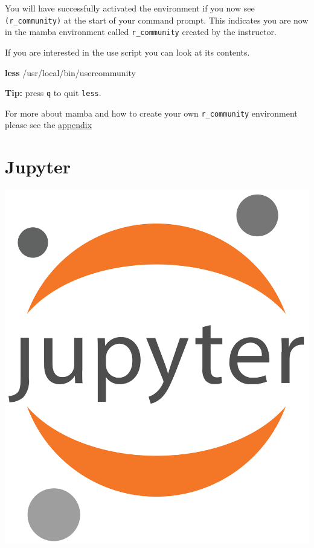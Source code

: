 \documentclass[
]{book}
\newenvironment{Shaded}{\begin{snugshade}}{\end{snugshade}}
\newcommand{\FunctionTok}[1]{\textcolor[rgb]{0.13,0.29,0.53}{\textbf{#1}}}
\newcommand{\NormalTok}[1]{#1}
\begin{document}
You will have successfully activated the environment if you now see \texttt{(r\_community)} at the start of your command prompt.
This indicates you are now in the mamba environment called \texttt{r\_community} created by the instructor.

If you are interested in the use script you can look at its contents.

\begin{Shaded}
\begin{Highlighting}[]
\FunctionTok{less}\NormalTok{ /usr/local/bin/usercommunity}
\end{Highlighting}
\end{Shaded}

\textbf{Tip:} press \texttt{q} to quit \texttt{less}.

For more about mamba and how to create your own \texttt{r\_community} environment please see the \protect\hyperlink{mamba_install}{appendix}

\hypertarget{jupyterchap}{%
\chapter{Jupyter}\label{jupyterchap}}

\includegraphics{figures/jupyter_logo.png}
\end{document}

